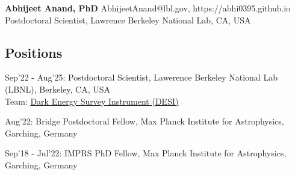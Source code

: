 \documentclass[12pt,letterpaper]{article}
\begin{document}
\thispagestyle{empty}\sloppy\sloppypar\raggedbottom

\textbf{\Large Abhijeet Anand, PhD} \hfill
\textsf{\small AbhijeetAnand@lbl.gov, https://abhi0395.github.io}\\[0.3ex]
Postdoctoral Scientist, Lawrence Berkeley National Lab, CA, USA\\[0.5ex]

\subsection{Positions}
\begin{list}{}{\cvlist}
\item
Sep'22 - Aug'25: Postdoctoral Scientist, Lawerence Berkeley National Lab (LBNL), Berkeley, CA, USA \\
    \hspace{6mm}Team: \href{https://www.desi.lbl.gov/}{Dark Energy Survey Instrument (DESI)}
\item Aug'22: Bridge Postdoctoral Fellow, Max Planck Institute for Astrophysics, Garching, Germany
\item
Sep'18 - Jul'22: IMPRS PhD Fellow, Max Planck Institute for Astrophysics, Garching, Germany
\end{list}
\end{document}
